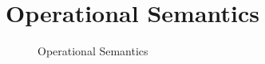 \section{Operational Semantics}

\begin{figure}
    \centering
    
    \caption{Operational Semantics}
    \label{fig:operational-semantics}
\end{figure}